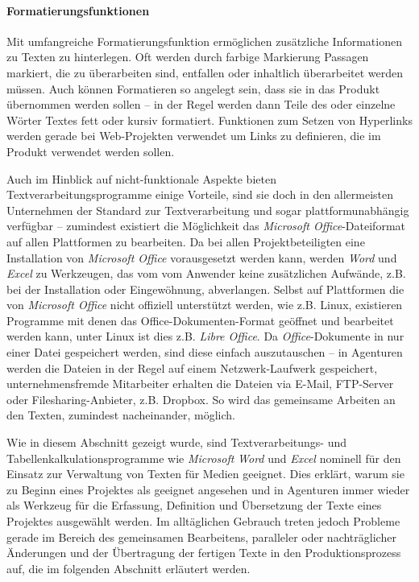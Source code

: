 \paragraph{Formatierungsfunktionen} Mit umfangreiche Formatierungsfunktion ermöglichen zusätzliche Informationen zu Texten zu hinterlegen. Oft werden durch farbige Markierung Passagen markiert, die zu überarbeiten sind, entfallen oder inhaltlich überarbeitet werden müssen. Auch können Formatieren so angelegt sein, dass sie in das Produkt übernommen werden sollen -- in der Regel werden dann Teile des oder einzelne Wörter Textes fett oder kursiv formatiert. Funktionen zum Setzen von Hyperlinks werden gerade bei Web-Projekten verwendet um Links zu definieren, die im Produkt verwendet werden sollen.

\bigskip

Auch im Hinblick auf nicht-funktionale Aspekte bieten Textverarbeitungsprogramme einige Vorteile, sind sie doch in den allermeisten Unternehmen der Standard zur Textverarbeitung und sogar plattformunabhängig verfügbar -- zumindest existiert die Möglichkeit das \emph{Microsoft Office}-Dateiformat auf allen Plattformen zu bearbeiten. Da bei allen Projektbeteiligten eine Installation von \emph{Microsoft Office} vorausgesetzt werden kann, werden \emph{Word} und \emph{Excel} zu  Werkzeugen, das vom vom Anwender keine zusätzlichen Aufwände, z.B. bei der Installation oder Eingewöhnung, abverlangen. Selbst auf Plattformen die von \emph{Microsoft Office} nicht offiziell unterstützt werden, wie z.B. Linux, existieren Programme mit denen das Office-Dokumenten-Format geöffnet und bearbeitet werden kann, unter Linux ist dies z.B. \emph{Libre Office}. Da \emph{Office}-Dokumente in nur einer Datei gespeichert werden, sind diese einfach auszutauschen -- in Agenturen werden die Dateien in der Regel auf einem Netzwerk-Laufwerk gespeichert, unternehmensfremde Mitarbeiter erhalten die Dateien via E-Mail, FTP-Server oder Filesharing-Anbieter, z.B. Dropbox. So wird das gemeinsame Arbeiten an den Texten, zumindest nacheinander, möglich. 

\bigskip

Wie in diesem Abschnitt gezeigt wurde, sind Textverarbeitungs- und Tabellenkalkulationsprogramme wie \emph{Microsoft} \emph{Word} und \emph{Excel} nominell für den Einsatz zur Verwaltung von Texten für Medien geeignet. Dies erklärt, warum sie zu Beginn eines Projektes als geeignet angesehen und in Agenturen immer wieder als Werkzeug für die Erfassung, Definition und Übersetzung der Texte eines Projektes ausgewählt werden. Im alltäglichen Gebrauch treten jedoch Probleme gerade im Bereich des gemeinsamen Bearbeitens, paralleler oder nachträglicher Änderungen und der Übertragung der fertigen Texte in den Produktionsprozess auf, die im folgenden Abschnitt erläutert werden.

